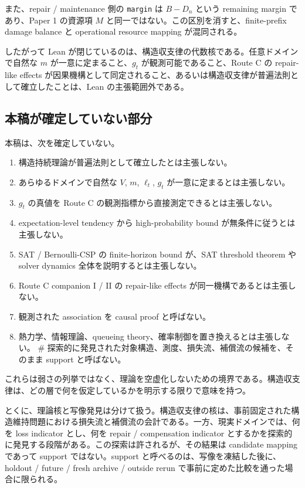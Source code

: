 \documentclass[12pt,a4paper]{article}
\begin{document}
また、repair / maintenance 側の \texttt{margin} は \(B-D_{n}\) という remaining margin であり、Paper 1 の資源項 \(M\) と同一ではない。この区別を消すと、finite-prefix damage balance と operational resource mapping が混同される。

したがって Lean が閉じているのは、構造収支律の代数核である。任意ドメインで自然な \(m\) が一意に定まること、\(g_{t}\) が観測可能であること、Route C の repair-like effects が因果機構として同定されること、あるいは構造収支律が普遍法則として確立したことは、Lean の主張範囲外である。

\subsection{本稿が確定していない部分}\label{ux672cux7a3fux304cux78baux5b9aux3057ux3066ux3044ux306aux3044ux90e8ux5206}

本稿は、次を確定していない。

\begin{enumerate}
\def\labelenumi{\arabic{enumi}.}
\tightlist
\item
  構造持続理論が普遍法則として確立したとは主張しない。
\item
  あらゆるドメインで自然な \(V\), \(m\), \(\ell_{t}\), \(g_{t}\) が一意に定まるとは主張しない。
\item
  \(g_{t}\) の真値を Route C の観測指標から直接測定できるとは主張しない。
\item
  expectation-level tendency から high-probability bound が無条件に従うとは主張しない。
\item
  SAT / Bernoulli-CSP の finite-horizon bound が、SAT threshold theorem や solver dynamics 全体を説明するとは主張しない。
\item
  Route C companion I / II の repair-like effects が同一機構であるとは主張しない。
\item
  観測された association を causal proof と呼ばない。
\item
  熱力学、情報理論、queueing theory、確率制御を置き換えるとは主張しない。 \# 探索的に発見された対象構造、測度、損失流、補償流の候補を、そのまま support と呼ばない。
\end{enumerate}

これらは弱さの列挙ではなく、理論を空虚化しないための境界である。構造収支律は、どの層で何を仮定しているかを明示する限りで意味を持つ。

とくに、理論核と写像発見は分けて扱う。構造収支律の核は、事前固定された構造維持問題における損失流と補償流の会計である。一方、現実ドメインでは、何を loss indicator とし、何を repair / compensation indicator とするかを探索的に発見する段階がある。この探索は許されるが、その結果は candidate mapping であって support ではない。support と呼べるのは、写像を凍結した後に、holdout / future / fresh archive / outside rerun で事前に定めた比較を通った場合に限られる。
\end{document}
